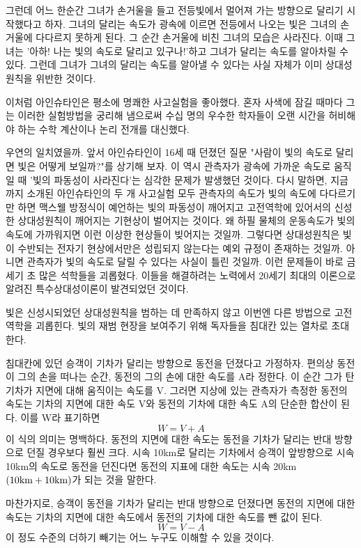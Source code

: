 그런데 어느 한순간 그녀가 손거울을 들고 전등빛에서 멀어져 가는 방향으로 달리기
시작했다고 하자. 그녀의 달리는 속도가 광속에 이르면 전등에서 나오는 빛은 그녀의
손거울에 다다르지 못하게 된다. 그 순간 손거울에 비친 그녀의 모습은 사라진다. 이때
그녀는 '아하! 나는 빛의 속도로 달리고 있구나!'하고 그녀가 달리는 속도를 알아차릴 수
있다. 그런데 그녀가 그녀의 달리는 속도를 알아낼 수 있다는 사실 자체가 이미 상대성원칙을
위반한 것이다.

이처럼 아인슈타인은 평소에 명쾌한 사고실험을 좋아했다. 혼자 사색에 잠길 때마다 그는
이러한 실험방법을 궁리해 냄으로써 수십 명의 우수한 학자들이 오랜 시간을 허비해야 하는
수학 계산이나 논리 전개를 대신했다.

우연의 일치였을까. 앞서 아인슈타인이 16세 때 던졌던 질문 "사람이 빛의 속도로 달리면 빛은
어떻게 보일까?"를 상기해 보자. 이 역시 관측자가 광속에 가까운 속도로 움직일 때 '빛의
파동성이 사라진다'는 심각한 문제가 발생했던 것이다. 다시 말하면, 지금까지 소개된
아인슈타인의 두 개 사고실험 모두 관측자의 속도가 빛의 속도에 다다르기만 하면 맥스웰
방정식이 예언하는 빛의 파동성이 깨어지고 고전역학에 있어서의 신성한 상대성원칙이 깨어지는
기현상이 벌어지는 것이다. 왜 하필 물체의 운동속도가 빛의 속도에 가까워지면 이런 이상한
현상들이 빚어지는 것일까. 그렇다면 상대성원칙은 빛이 수반되는 전자기 현상에서만은 성립되지
않는다는 예외 규정이 존재하는 것일까. 아니면 관측자가 빛의 속도로 달릴 수 있다는 사실이
틀린 것일까. 이런 문제들이 바로 금세기 초 많은 석학들을 괴롭혔다. 이들을 해결하려는
노력에서 20세기 최대의 이론으로 알려진 특수상대성이론이 발견되었던 것이다.

빛은 신성시되었던 상대성원칙을 범하는 데 만족하지 않고 이번엔 다른 방법으로 고전역학을
괴롭힌다. 빛의 재범 현장을 보여주기 위해 독자들을 침대칸 있는 열차로 초대한다.

침대칸에 있던 승객이 기차가 달리는 방향으로 동전을 던졌다고 가정하자. 편의상 동전이 그의
손을 떠나는 순간, 동전의 그의 손에 대한 속도를 A라 정한다. 이 순간 그가 탄 기차가 지면에
대해 움직이는 속도를 V. 그러면 지상에 있는 관측자가 측정한 동전의 속도는 기차의 지면에
대한 속도 V와 동전의 기차에 대한 속도 A의 단순한 합산이 된다. 이를 W라 표기하면
$$  W = V + A $$
이 식의 의미는 명백하다. 동전의 지면에 대한 속도는 동전을 기차가 달리는 반대 방향으로
던질 경우보다 훨씬 크다. 시속 10km로 달리는 기차에서 승객이 앞방향으로 시속 10km의 속도로
동전을 던진다면 동전의 지표에 대한 속도는 시속 20km$(10\hbox{km}+10\hbox{km})$가
되는 것을 말한다.

마찬가지로, 승객이 동전을 기차가 달리는 반대 방향으로 던졌다면 동전의 지면에 대한 속도는
기차의 지면에 대한 속도에서 동전의 기차에 대한 속도를 뺀 값이 된다.
$$ W = V - A$$
이 정도 수준의 더하기 빼기는 어느 누구도 이해할 수 있을 것이다.

